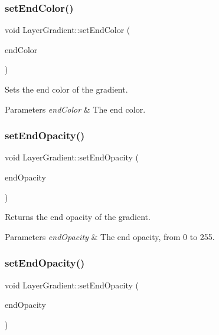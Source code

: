 \subsubsection{\texorpdfstring{set\+End\+Color()}{setEndColor()}\hspace{0.1cm}{\footnotesize\ttfamily [2/2]}}
{\footnotesize\ttfamily void Layer\+Gradient\+::set\+End\+Color (\begin{DoxyParamCaption}\item[{const \hyperlink{structColor3B}{Color3B} \&}]{end\+Color }\end{DoxyParamCaption})}

Sets the end color of the gradient.


\begin{DoxyParams}{Parameters}
{\em end\+Color} & The end color. \\
\hline
\end{DoxyParams}
\mbox{\label{classLayerGradient_ace5db1ce5036e95b70f3038391f74f83}} 
\subsubsection{\texorpdfstring{set\+End\+Opacity()}{setEndOpacity()}\hspace{0.1cm}{\footnotesize\ttfamily [1/2]}}
{\footnotesize\ttfamily void Layer\+Gradient\+::set\+End\+Opacity (\begin{DoxyParamCaption}\item[{G\+Lubyte}]{end\+Opacity }\end{DoxyParamCaption})}

Returns the end opacity of the gradient.


\begin{DoxyParams}{Parameters}
{\em end\+Opacity} & The end opacity, from 0 to 255. \\
\hline
\end{DoxyParams}
\mbox{\label{classLayerGradient_ace5db1ce5036e95b70f3038391f74f83}} 
\subsubsection{\texorpdfstring{set\+End\+Opacity()}{setEndOpacity()}\hspace{0.1cm}{\footnotesize\ttfamily [2/2]}}
{\footnotesize\ttfamily void Layer\+Gradient\+::set\+End\+Opacity (\begin{DoxyParamCaption}\item[{G\+Lubyte}]{end\+Opacity }\end{DoxyParamCaption})}

